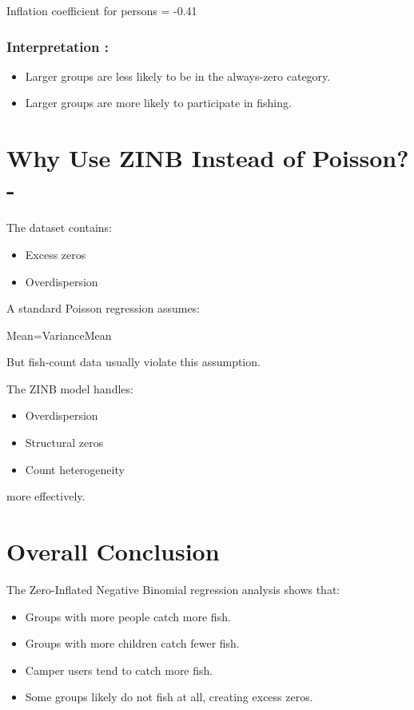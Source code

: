 \documentclass[
]{article}
\begin{document}
Inflation coefficient for persons = -0.41

\subsubsection{Interpretation :}\label{interpretation-22}

\begin{itemize}
\item
  Larger groups are less likely to be in the always-zero category.
\item
  Larger groups are more likely to participate in fishing.
\end{itemize}

\section{\texorpdfstring{ Why Use ZINB Instead of
Poisson?-}{ Why Use ZINB Instead of Poisson?-}}\label{why-use-zinb-instead-of-poisson-}

The dataset contains:

\begin{itemize}
\item
  Excess zeros
\item
  Overdispersion
\end{itemize}

A standard Poisson regression assumes:

Mean=VarianceMean

But fish-count data usually violate this assumption.

The ZINB model handles:

\begin{itemize}
\item
  Overdispersion
\item
  Structural zeros
\item
  Count heterogeneity
\end{itemize}

more effectively.

\section{Overall Conclusion}\label{overall-conclusion}

The Zero-Inflated Negative Binomial regression analysis shows that:

\begin{itemize}
\item
  Groups with more people catch more fish.
\item
  Groups with more children catch fewer fish.
\item
  Camper users tend to catch more fish.
\item
  Some groups likely do not fish at all, creating excess zeros.
\end{itemize}
\end{document}
